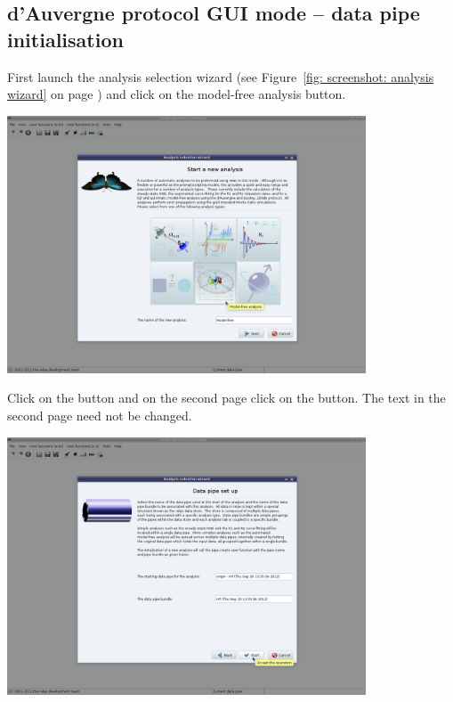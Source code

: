 \begin{htmlonly}
\begin{htmlonly}

\subsection{d'Auvergne protocol GUI mode -- data pipe initialisation}

First launch the analysis selection wizard (see Figure~\ref{fig: screenshot: analysis wizard} on page \pageref{fig: screenshot: analysis wizard}) and click on the model-free analysis button.

\begin{minipage}[h]{\linewidth}
\centerline{\includegraphics[width=0.8\textwidth, bb=14 14 1415 1019]{graphics/screenshots/mf_analysis/analysis_wizard1}}
\end{minipage}

Click on the  button and on the second page click on the  button.  The text in the second page need not be changed.

\begin{minipage}[h]{\linewidth}
\centerline{\includegraphics[width=0.8\textwidth, bb=14 14 1415 1019]{graphics/screenshots/mf_analysis/analysis_wizard2}}
\end{minipage}



\end{htmlonly}
\end{htmlonly}
